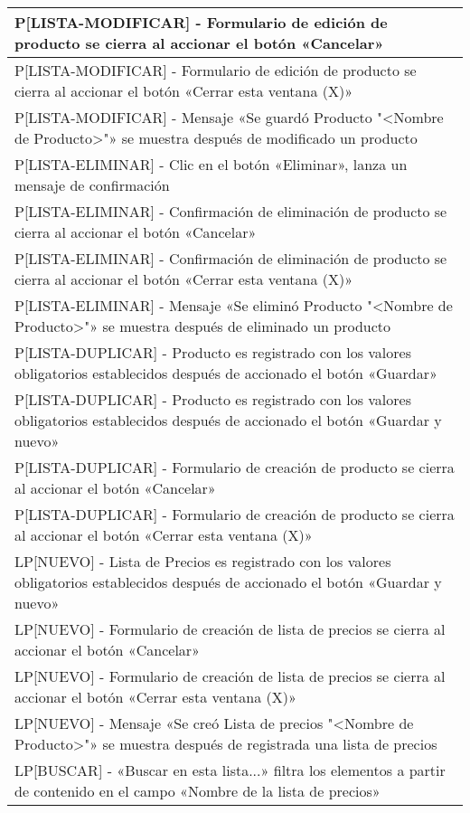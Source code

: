 \begin{longtable}{|p{15.0cm}|}
P[LISTA-MODIFICAR] - Formulario de edición de producto se cierra al accionar el botón «Cancelar» \\ \hline
P[LISTA-MODIFICAR] - Formulario de edición de producto se cierra al accionar el botón «Cerrar esta ventana (X)» \\ \hline
P[LISTA-MODIFICAR] - Mensaje «Se guardó Producto "<Nombre de Producto>"» se muestra después de modificado un producto \\ \hline
P[LISTA-ELIMINAR] - Clic en el botón «Eliminar», lanza un mensaje de confirmación \\ \hline
P[LISTA-ELIMINAR] - Confirmación de eliminación de producto se cierra al accionar el botón «Cancelar» \\ \hline
P[LISTA-ELIMINAR] - Confirmación de eliminación de producto se cierra al accionar el botón «Cerrar esta ventana (X)» \\ \hline
P[LISTA-ELIMINAR] - Mensaje «Se eliminó Producto "<Nombre de Producto>"» se muestra después de eliminado un producto \\ \hline
P[LISTA-DUPLICAR] - Producto es registrado con los valores obligatorios establecidos después de accionado el botón «Guardar» \\ \hline
P[LISTA-DUPLICAR] - Producto es registrado con los valores obligatorios establecidos después de accionado el botón «Guardar y nuevo» \\ \hline
P[LISTA-DUPLICAR] - Formulario de creación de producto se cierra al accionar el botón «Cancelar» \\ \hline
P[LISTA-DUPLICAR] - Formulario de creación de producto se cierra al accionar el botón «Cerrar esta ventana (X)» \\ \hline
LP[NUEVO] - Lista de Precios es registrado con los valores obligatorios establecidos después de accionado el botón «Guardar y nuevo» \\ \hline
LP[NUEVO] - Formulario de creación de lista de precios se cierra al accionar el botón «Cancelar» \\ \hline
LP[NUEVO] - Formulario de creación de lista de precios se cierra al accionar el botón «Cerrar esta ventana (X)» \\ \hline
LP[NUEVO] - Mensaje «Se creó Lista de precios "<Nombre de Producto>"» se muestra después de registrada una lista de precios \\ \hline
LP[BUSCAR] - «Buscar en esta lista...» filtra los elementos a partir de contenido en el campo «Nombre de la lista de precios» \\ \hline

\end{longtable}
